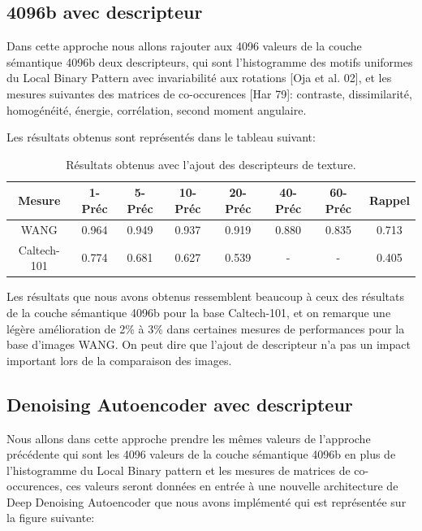 \subsection{4096b avec descripteur}
	Dans cette approche nous allons rajouter aux 4096 valeurs de la couche sémantique 4096b deux descripteurs, qui sont l'histogramme des motifs uniformes du Local Binary Pattern avec invariabilité aux rotations [Oja et al. 02], et les mesures suivantes des matrices de co-occurences [Har 79]: contraste, dissimilarité, homogénéité, énergie, corrélation, second moment angulaire.
	
	Les résultats obtenus sont représentés dans le tableau suivant: 

\begin{table}[H]
\begin{center}
\begin{tabular}{|c|c|c|c|c|c|c|c|}
\hline
	Mesure & 1-Préc & 5-Préc & 10-Préc & 20-Préc & 40-Préc & 60-Préc & Rappel\\
\hline
	WANG & 0.964 & 0.949 & 0.937 & 0.919 & 0.880 & 0.835 & 0.713\\
\hline
	Caltech-101 & 0.774 & 0.681 & 0.627 & 0.539 & - & - & 0.405\\
\hline
\end{tabular}
\end{center}
\caption{Résultats obtenus avec l'ajout des descripteurs de texture.}
\end{table}

	Les résultats que nous avons obtenus ressemblent beaucoup à ceux des résultats de la couche sémantique 4096b pour la base Caltech-101, et on remarque une légère amélioration de 2\% à 3\% dans certaines mesures de performances pour la base d'images WANG. On peut dire que l'ajout de descripteur n'a pas un impact important lors de la comparaison des images.


\subsection{Denoising Autoencoder avec descripteur}
	Nous allons dans cette approche prendre les mêmes valeurs de l'approche précédente qui sont les 4096 valeurs de la couche sémantique 4096b en plus de l'histogramme du Local Binary pattern et les mesures de matrices de co-occurences, ces valeurs seront données en entrée à une nouvelle architecture de Deep Denoising Autoencoder que nous avons implémenté qui est représentée sur la figure suivante:
	
